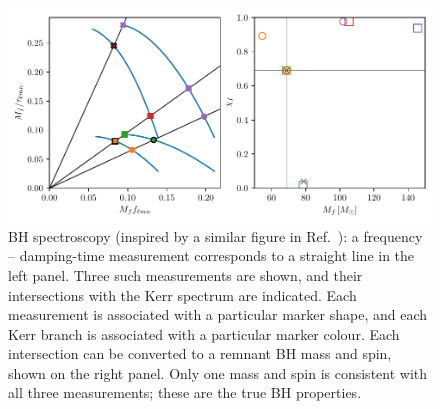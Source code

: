 \begin{figure}[t]
    \centering
    \includegraphics[width=0.9\columnwidth]{Figures/Introduction/bh_spectroscopy.pdf}
    \caption[Black-hole spectroscopy illustration]{
    BH spectroscopy (inspired by a similar figure in Ref.~\cite{Dreyer:2003bv}): a frequency -- damping-time measurement corresponds to a straight line in the left panel. Three such measurements are shown, and their intersections with the Kerr spectrum are indicated. Each measurement is associated with a particular marker shape, and each Kerr branch is associated with a particular marker colour. Each intersection can be converted to a remnant BH mass and spin, shown on the right panel. Only one mass and spin is consistent with all three measurements; these are the true BH properties.
    }
    \label{ch1:fig:bh_spectroscopy}
\end{figure}

